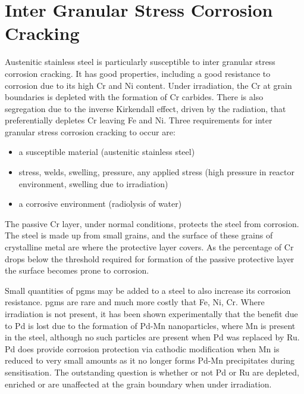 \section{Inter Granular Stress Corrosion Cracking}

Austenitic stainless steel is particularly susceptible to inter granular stress corrosion cracking.  It has good properties, including a good resistance to corrosion due to its high Cr and Ni content.  Under irradiation, the Cr at grain boundaries is depleted with the formation of Cr carbides.  There is also segregation due to the inverse Kirkendall effect, driven by the radiation, that preferentially depletes \Gls{Cr} leaving \Gls{Fe} and \Gls{Ni}. Three requirements for inter granular stress corrosion cracking to occur are:

\begin{itemize}
\item a susceptible material (austenitic stainless steel)
\item stress, welds, swelling, pressure, any applied stress (high pressure in reactor environment, swelling due to irradiation)
\item a corrosive environment (radiolysis of water)
\end{itemize}

The passive Cr layer, under normal conditions, protects the steel from corrosion.  The steel is made up from small grains, and the surface of these grains of crystalline metal are where the protective layer covers.  As the percentage of Cr drops below the threshold required for formation of the passive protective layer the surface becomes prone to corrosion.

Small quantities of \acrshort{pgm}s may be added to a steel to also increase its corrosion resistance.  \Acrshort{pgm}s are rare and much more costly that Fe, Ni, Cr.  Where irradiation is not present, it has been shown experimentally that the benefit due to Pd is lost due to the formation of Pd-Mn nanoparticles, where Mn is present in the steel, although no such particles are present when Pd was replaced by Ru.  Pd does provide corrosion protection via cathodic modification when Mn is reduced to very small amounts as it no longer forms Pd-Mn precipitates during sensitisation.  The outstanding question is whether or not Pd or Ru are depleted, enriched or are unaffected at the grain boundary when under irradiation.




